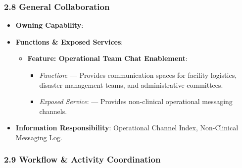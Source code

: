 \par\smallskip
{}\label{rad:ise:160}
\subsubsection*{2.8 General Collaboration}
\label{rad:ise:161}

\begin{itemize}

\item
\textbf{Owning Capability}: \texttt{}



\item
\textbf{Functions \& Exposed Services}:


\begin{itemize}

\item
\textbf{Feature: Operational Team Chat Enablement}:


\begin{itemize}

\item
\emph{Function}: \texttt{} — Provides communication spaces for facility logistics, disaster management teams, and administrative committees.



\item
\emph{Exposed Service}: \texttt{} — Provides non-clinical operational messaging channels.



\end{itemize}


\end{itemize}


\item
\textbf{Information Responsibility}: Operational Channel Index, Non-Clinical Messaging Log.



\end{itemize}
\label{rad:ise:168}

\par\smallskip
{}\label{rad:ise:170}
\subsubsection*{2.9 Workflow \& Activity Coordination}
\label{rad:ise:171}

